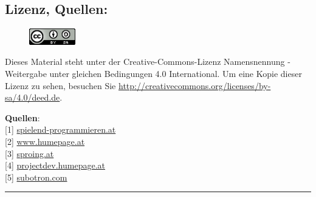 \documentclass[10pt,a4paper,ngerman,twoside]{article} %
\newcommand{\SepRule}{\noindent	%
\begin{center}
\rule{250pt}{1pt} %
\end{center}
}
\begin{document}
\begin{multicols}{3}
\subsection*{Lizenz, Quellen:}
\begin{figure}
\includegraphics[width=2cm]{spieletester/ccbysa88x31.png}
\end{figure}
Dieses Material steht unter der Creative-Commons-Lizenz Namensnennung - Weitergabe unter gleichen Bedingungen 4.0 International. Um eine Kopie dieser Lizenz zu sehen, besuchen Sie \url{http://creativecommons.org/licenses/by-sa/4.0/deed.de}.


\textbf{Quellen}: \\
{[}1{]} \href{http://spielend-programmieren.at}{spielend-programmieren.at} \\
{[}2{]} \href{http://www.humepage.at}{www.humepage.at} \\
{[}3{]} \href{https://www.sproing.at/}{sproing.at} \\
{[}4{]} \href{http://projectdev.humepage.at/}{projectdev.humepage.at} \\
{[}5{]} \href{http://subotron.com/}{subotron.com} \\








\end{multicols} %
\SepRule
\end{document}
